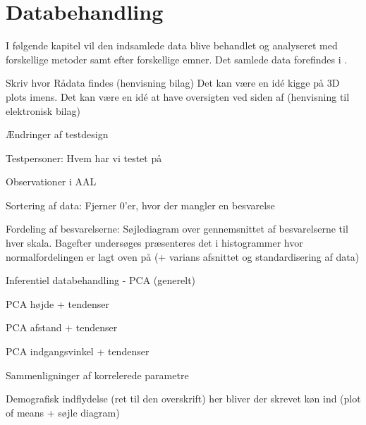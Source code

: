 \chapter{Databehandling}
\label{TestAfSkalaDatabehandling}
%
I følgende kapitel vil den indsamlede data blive behandlet og analyseret med forskellige metoder samt efter forskellige emner. Det samlede data forefindes i .  

Skriv hvor Rådata findes (henvisning bilag) 
Det kan være en idé kigge på 3D plots imens. 
Det kan være en idé at have oversigten ved siden af (henvisning til elektronisk bilag)



Ændringer af testdesign

Testpersoner: Hvem har vi testet på 

Observationer i AAL

Sortering af data: Fjerner 0'er, hvor der mangler en besvarelse

Fordeling af besvarelserne: Søjlediagram over gennemsnittet af besvarelserne til hver skala. Bagefter undersøges præsenteres det i histogrammer hvor normalfordelingen er lagt oven på (+ varians afsnittet og standardisering af data)

Inferentiel databehandling - PCA (generelt) 

PCA højde + tendenser

PCA afstand + tendenser

PCA indgangsvinkel + tendenser

Sammenligninger af korrelerede parametre

Demografisk indflydelse (ret til den overskrift) her bliver der skrevet køn ind (plot of means + søjle diagram)